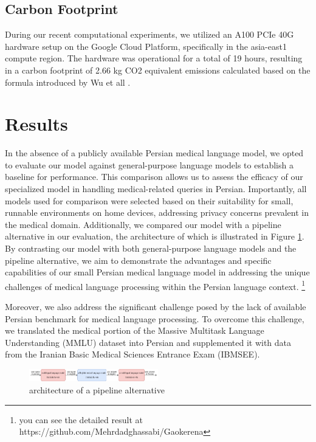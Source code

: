 \documentclass[conference]{IEEEtran}
\begin{document}
\subsection{Carbon Footprint}
During our recent computational experiments, we utilized an A100 PCIe 40G hardware setup on the Google Cloud Platform, specifically in the asia-east1 compute region. The hardware was operational for a total of 19 hours, resulting in a carbon footprint of 2.66 kg CO2 equivalent emissions calculated  based on the formula introduced by Wu et all
\cite{b14}
.
\section{Results}
In the absence of a publicly available Persian medical language model, we opted to evaluate our model against general-purpose language models to establish a baseline for performance. This comparison allows us to assess the efficacy of our specialized model in handling medical-related queries in Persian. Importantly, all models used for comparison were selected based on their suitability for small, runnable environments on home devices, addressing privacy concerns prevalent in the medical domain. Additionally, we compared our model with a pipeline alternative in our evaluation, the architecture of which is illustrated in Figure \ref{fig3}. By contrasting our model with both general-purpose language models and the pipeline alternative, we aim to demonstrate the advantages and specific capabilities of our small Persian medical language model in addressing the unique challenges of medical language processing within the Persian language context.
\footnote{
	you can see the detailed result at https://github.com/Mehrdadghassabi/Gaokerena
}

Moreover, we also address the significant challenge posed by the lack of available Persian benchmark for medical language processing. To overcome this challenge, we translated the medical portion of the Massive Multitask Language Understanding (MMLU) dataset \cite{b18} into Persian and supplemented it with data from the Iranian Basic Medical Sciences Entrance Exam (IBMSEE).

\begin{figure}[htbp]
	\centerline{\includegraphics[width=0.5\textwidth]{fig3.png}}
	\caption{architecture of a pipeline alternative}
	\label{fig3}
\end{figure}
\end{document}
